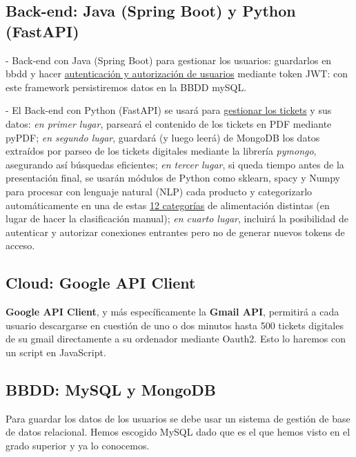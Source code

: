 \documentclass[a4paper,12pt]{report}
\begin{document}
	
		 
		\subsection{Back-end: Java (Spring Boot) y Python (FastAPI)}
		
			- Back-end con Java (Spring Boot) para gestionar los usuarios: guardarlos en bbdd y hacer \underline{autenticación y autorización de usuarios} mediante token JWT: con este framework persistiremos datos en la BBDD mySQL.
			
			- El Back-end con Python (FastAPI) se usará para \underline{gestionar los tickets} y sus datos: \textit{en primer lugar}, parseará el contenido de los tickets en PDF mediante pyPDF; \textit{en segundo lugar}, guardará (y luego leerá) de MongoDB los datos extraídos por parseo de los tickets digitales mediante la librería \textit{pymongo}, asegurando así búsquedas eficientes; \textit{en tercer lugar}, si queda tiempo antes de la presentación final, se usarán módulos de Python como sklearn, spacy y Numpy para procesar con lenguaje natural (NLP) cada producto y categorizarlo automáticamente en una de estas \href{https://github.com/blackcub3s/mercApp/blob/main/APP%20WEB/__frontend__produccio__/app/js/dashboard/categories.js}{12 categorías} de alimentación distintas (en lugar de hacer la clasificación manual); \textit{en cuarto lugar}, incluirá la posibilidad de autenticar y autorizar conexiones entrantes pero no de generar nuevos tokens de acceso.
			
		
		\subsection{Cloud: Google API Client}
		
			\textbf{Google API Client}, y más específicamente la \textbf{Gmail API}, permitirá a cada usuario descargarse en cuestión de uno o dos minutos hasta 500 tickets digitales de su gmail directamente a su ordenador mediante Oauth2. Esto lo haremos con un script en JavaScript.
			
		\subsection{BBDD: MySQL y MongoDB}
		
		
		Para guardar los datos de los usuarios se debe usar un sistema de gestión de base de datos relacional. Hemos escogido MySQL dado que es el que hemos visto en el grado superior y ya lo conocemos.
		
\end{document}
